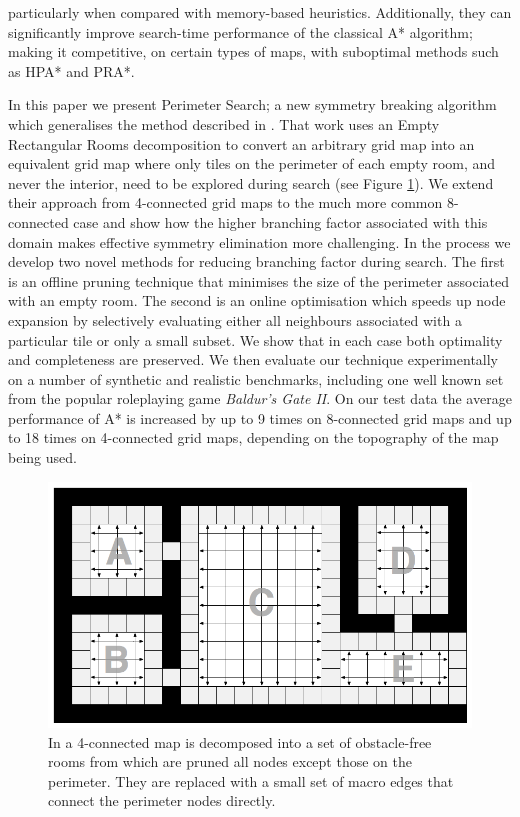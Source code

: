 particularly when compared with memory-based heuristics.
Additionally, they can significantly improve search-time performance of the classical A* algorithm; making it competitive,
on certain types of maps, with suboptimal methods such as HPA* and PRA*.
\par
In this paper we present Perimeter Search; a new symmetry breaking algorithm which generalises the method described in \cite{harabor10}.
That work uses an Empty Rectangular Rooms decomposition to convert an arbitrary grid map into an
equivalent grid map where only tiles on the perimeter of each empty room, and never the interior, need to be explored
during search (see Figure \ref{fig-overview}).
We extend their approach from 4-connected grid maps to the much more common 8-connected case and show how the higher branching factor associated 
with this domain makes effective symmetry elimination more challenging.
In the process we develop two novel methods for reducing branching factor during search.
The first is an offline pruning technique that minimises the size of the perimeter associated with an empty room.
The second is an online optimisation which speeds up node expansion by selectively evaluating either all neighbours
associated with a particular tile or only a small subset.
We show that in each case both optimality and completeness are preserved.
We then evaluate our technique experimentally on a number of synthetic and realistic benchmarks, including one well known set 
from the popular roleplaying game \emph{Baldur's Gate II}.
On our test data the average performance of A* is increased by up to 9 times on 8-connected grid maps and up to
18 times on 4-connected grid maps, depending on the topography of the map being used.

\begin{figure}[tb]
       \begin{center}
                       \includegraphics[scale=0.30, trim = 10mm 10mm 10mm 0mm]{diagrams/overview.png}
       \end{center}
	\vspace{-3pt}
       \caption{In \cite{harabor10} a 4-connected map is decomposed into a set of obstacle-free rooms from which are pruned all nodes except those on the perimeter.
				They are replaced with a small set of macro edges that connect the perimeter nodes directly.}
       \label{fig-overview}
\end{figure}
